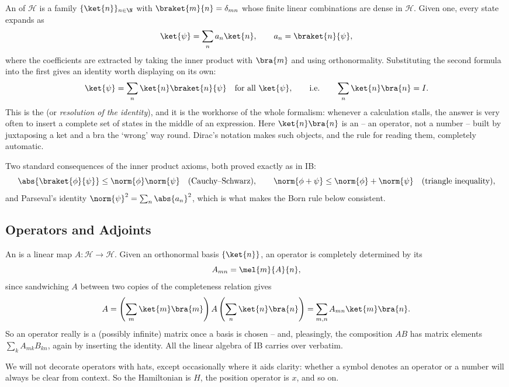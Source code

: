 An  of $\mathcal{H}$ is a family $\{\ket{n}\}_{n \in \N}$ with $\braket{m}{n} = \delta_{mn}$ whose finite linear combinations are dense in $\mathcal{H}$. Given one, every state expands as
$$
\ket{\psi} = \sum_n a_n \ket{n}, \qquad a_n = \braket{n}{\psi},
$$
where the coefficients are extracted by taking the inner product with $\bra{m}$ and using orthonormality. Substituting the second formula into the first gives an identity worth displaying on its own:
$$
\ket{\psi} = \sum_n \ket{n} \braket{n}{\psi} \quad \text{for all } \ket{\psi}, \qquad \text{i.e.} \qquad \sum_n \ket{n}\bra{n} = I.
$$
This is the  (or \emph{resolution of the identity}), and it is the workhorse of the whole formalism: whenever a calculation stalls, the answer is very often to insert a complete set of states in the middle of an expression. Here $\ket{n}\bra{n}$ is an  -- an operator, not a number -- built by juxtaposing a ket and a bra the `wrong' way round. Dirac's notation makes such objects, and the rule for reading them, completely automatic.

Two standard consequences of the inner product axioms, both proved exactly as in IB:
$$
\abs{\braket{\phi}{\psi}} \leq \norm{\phi}\norm{\psi} \quad \text{(Cauchy--Schwarz)}, \qquad
\norm{\phi + \psi} \leq \norm{\phi} + \norm{\psi} \quad \text{(triangle inequality)},
$$
and Parseval's identity $\norm{\psi}^2 = \sum_n \abs{a_n}^2$, which is what makes the Born rule below consistent.

\subsection{Operators and Adjoints}

An  is a linear map $A : \mathcal{H} \to \mathcal{H}$. Given an orthonormal basis $\{\ket{n}\}$, an operator is completely determined by its 
$$
A_{mn} = \mel{m}{A}{n},
$$
since sandwiching $A$ between two copies of the completeness relation gives
$$
A = \left(\sum_m \ket{m}\bra{m}\right) A \left(\sum_n \ket{n}\bra{n}\right) = \sum_{m,n} A_{mn} \ket{m}\bra{n}.
$$
So an operator really is a (possibly infinite) matrix once a basis is chosen -- and, pleasingly, the composition $AB$ has matrix elements $\sum_k A_{mk}B_{kn}$, again by inserting the identity. All the linear algebra of IB carries over verbatim.

\begin{notation}
    We will not decorate operators with hats, except occasionally where it aids clarity: whether a symbol denotes an operator or a number will always be clear from context. So the Hamiltonian is $H$, the position operator is $x$, and so on.
\end{notation}

